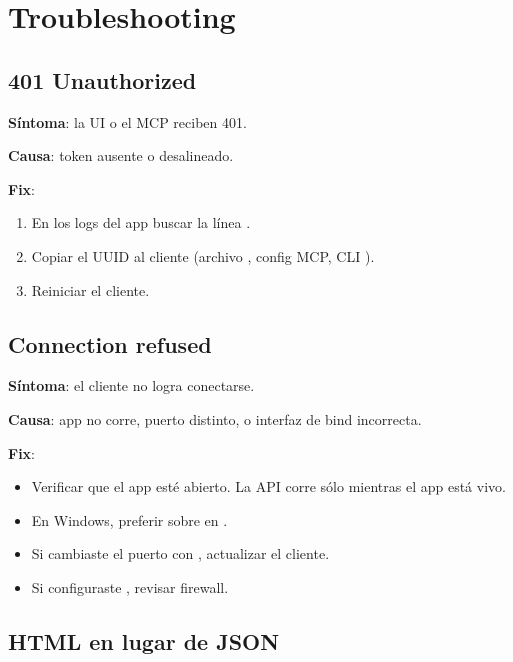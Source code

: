 \chapter{Troubleshooting}
\label{sec:man-troubleshooting}

\section{401 Unauthorized}

\textbf{Síntoma}: la UI o el MCP reciben 401.

\textbf{Causa}: token ausente o desalineado.

\textbf{Fix}:

\begin{enumerate}
    \item En los logs del app buscar la línea
    .
    \item Copiar el UUID al cliente (archivo ,
    config MCP, CLI ).
    \item Reiniciar el cliente.
\end{enumerate}

\section{Connection refused}

\textbf{Síntoma}: el cliente no logra conectarse.

\textbf{Causa}: app no corre, puerto distinto, o interfaz de bind
incorrecta.

\textbf{Fix}:

\begin{itemize}
    \item Verificar que el app esté abierto. La API corre sólo
    mientras el app está vivo.
    \item En Windows, preferir  sobre
     en .
    \item Si cambiaste el puerto con
    , actualizar el cliente.
    \item Si configuraste ,
    revisar firewall.
\end{itemize}

\section{HTML en lugar de JSON}

